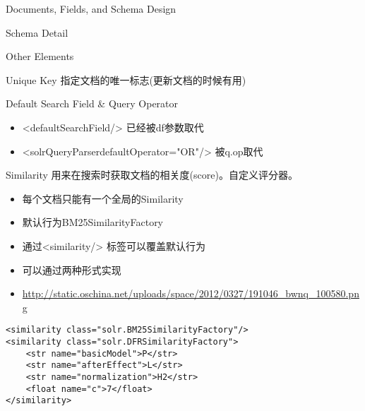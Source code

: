 \documentclass[presentation]{beamer}
\begin{document}
\begin{frame}[fragile,label={sec:orgc0e77e6}]{Documents, Fields, and Schema Design}
\begin{block}{Schema Detail}
\begin{block}{Other Elements}
\begin{block}{Unique Key}
指定文档的唯一标志(更新文档的时候有用)
\end{block}
\begin{block}{Default Search Field \& Query Operator}
\begin{itemize}
\item <defaultSearchField/> 已经被df参数取代
\item <solrQueryParserdefaultOperator="OR"/> 被q.op取代
\end{itemize}
\end{block}
\begin{block}{Similarity}
用来在搜索时获取文档的相关度(score)。自定义评分器。
\begin{itemize}
\item 每个文档只能有一个全局的Similarity
\item 默认行为BM25SimilarityFactory
\item 通过<similarity/> 标签可以覆盖默认行为
\item 可以通过两种形式实现
\item \url{http://static.oschina.net/uploads/space/2012/0327/191046\_bwnq\_100580.png}
\end{itemize}
\begin{verbatim}
<similarity class="solr.BM25SimilarityFactory"/>
<similarity class="solr.DFRSimilarityFactory">
    <str name="basicModel">P</str>
    <str name="afterEffect">L</str>
    <str name="normalization">H2</str>
    <float name="c">7</float>
</similarity>
\end{verbatim}
\end{block}
\end{block}



\end{block}
\end{frame}
\end{document}
